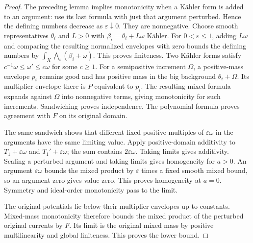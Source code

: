 \begin{proof}
The preceding lemma implies monotonicity when a K\"ahler form is added to an argument: use its last formula with just that argument perturbed. Hence the defining numbers decrease as $\varepsilon\downarrow0$. They are nonnegative. Choose smooth representatives $\theta_i$ and $L>0$ with $\beta_i=\theta_i+L\omega$ K\"ahler. For $0<\varepsilon\leq1$, adding $L\omega$ and comparing the resulting normalized envelopes with zero bounds the defining numbers by
$\int_X\bigwedge_i(\beta_i+\omega)$.
This proves finiteness. Two K\"ahler forms satisfy $c^{-1}\omega\leq\omega'\leq c\omega$ for some $c\geq1$. For a semipositive increment $\Omega$, a positive-mass envelope $p_i$ remains good and has positive mass in the big background $\theta_i+\Omega$. Its multiplier envelope there is $P$-equivalent to $p_i$. The resulting mixed formula expands against $\Omega$ into nonnegative terms, giving monotonicity for such increments. Sandwiching proves independence. The polynomial formula proves agreement with $F$ on its original domain.

The same sandwich shows that different fixed positive multiples of $\varepsilon\omega$ in the arguments have the same limiting value. Apply positive-domain additivity to $T_1+\varepsilon\omega$ and $T_1'+\varepsilon\omega$; the sum contains $2\varepsilon\omega$. Taking limits gives additivity. Scaling a perturbed argument and taking limits gives homogeneity for $a>0$. An argument $\varepsilon\omega$ bounds the mixed product by $\varepsilon$ times a fixed smooth mixed bound, so an argument zero gives value zero. This proves homogeneity at $a=0$. Symmetry and ideal-order monotonicity pass to the limit.

The original potentials lie below their multiplier envelopes up to constants. Mixed-mass monotonicity therefore bounds the mixed product of the perturbed original currents by $F$. Its limit is the original mixed mass by positive multilinearity and global finiteness. This proves the lower bound.
\end{proof}

